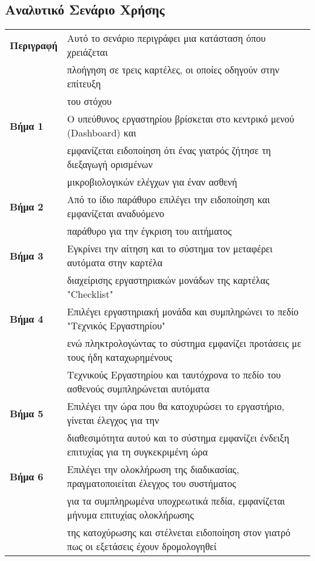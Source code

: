 \documentclass{article}
\newcommand\T{\rule{0pt}{2.6ex}}       %
\newcommand\B{\rule[-1.2ex]{0pt}{0pt}}
\begin{document}
 \newpage
 
  \subsection{Αναλυτικό Σενάριο Χρήσης}
 
  \begin{center}
     \begin{tabular}{|l|l|}
     \hline
      \textbf{Περιγραφή} & Αυτό το σενάριο περιγράφει μια κατάσταση όπου χρειάζεται \T \\& πλοήγηση σε τρεις καρτέλες, οι οποίες οδηγούν στην επίτευξη \\& του στόχου \B \\ 
      \hline
      \textbf{Βήμα 1} & Ο υπεύθυνος εργαστηρίου βρίσκεται στο κεντρικό μενού (Dashboard) και \T \\& εμφανίζεται ειδοποίηση ότι ένας γιατρός ζήτησε τη διεξαγωγή ορισμένων \\& μικροβιολογικών ελέγχων για έναν ασθενή\B \\
      \hline
      \textbf{Βήμα 2} & Από το ίδιο παράθυρο επιλέγει την ειδοποίηση και εμφανίζεται αναδυόμενο \T \\& παράθυρο για την έγκριση του αιτήματος\B\\
      \hline
      \textbf{Βήμα 3} & Εγκρίνει την αίτηση και το σύστημα τον μεταφέρει αυτόματα στην καρτέλα \T \\& διαχείρισης εργαστηριακών μονάδων της καρτέλας "Checklist"\B \\
      \hline
      \textbf{Βήμα 4} & Επιλέγει εργαστηριακή μονάδα και συμπληρώνει το πεδίο "Τεχνικός Εργαστηρίου"\T\\& ενώ πληκτρολογώντας το σύστημα εμφανίζει προτάσεις με τους ήδη καταχωρημένους \\& Τεχνικούς Εργαστηρίου και ταυτόχρονα το πεδίο του ασθενούς συμπληρώνεται αυτόματα  \B \\
      \hline
      \textbf{Βήμα 5} & Επιλέγει την ώρα που θα κατοχυρώσει το εργαστήριο, γίνεται έλεγχος για την \T\\& διαθεσιμότητα αυτού και το σύστημα εμφανίζει ένδειξη  επιτυχίας για τη συγκεκριμένη ώρα \B\\
      \hline
      \textbf{Βήμα 6} & Επιλέγει την ολοκλήρωση της διαδικασίας, πραγματοποιείται έλεγχος του συστήματος \T \\& για τα συμπληρωμένα υποχρεωτικά πεδία, εμφανίζεται μήνυμα επιτυχίας ολοκλήρωσης \\& της κατοχύρωσης και στέλνεται ειδοποίηση στον γιατρό πως οι εξετάσεις έχουν δρομολογηθεί \B\\

\end{tabular}
\end{center}
\end{document}
